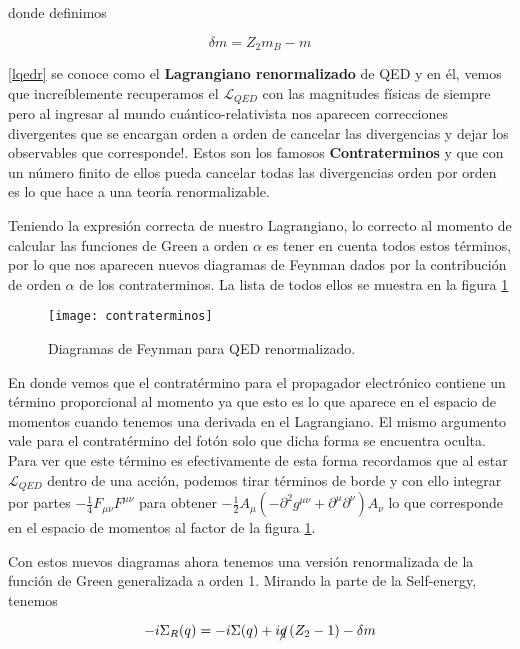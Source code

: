 \documentclass[tickz]{article}
\numberwithin{equation}{section}
\begin{document}
donde definimos 

\begin{equation}\label{deltam}
\delta m = Z_2 m_B - m
\end{equation}

\ref{lqedr} se conoce como el \textbf{Lagrangiano renormalizado} de QED y en él, vemos que increíblemente recuperamos el $ \mathscr{L}_{QED} $ con las magnitudes físicas de siempre pero al ingresar al mundo cuántico-relativista nos aparecen correcciones divergentes que se encargan orden a orden de cancelar las divergencias y dejar los observables que corresponde!. Estos son los famosos \textbf{Contraterminos} y que con un número finito de ellos pueda cancelar todas las divergencias orden por orden es lo que hace a una teoría renormalizable.

Teniendo la expresión correcta de nuestro Lagrangiano, lo correcto al momento de calcular las funciones de Green a orden $ \alpha $ es tener en cuenta todos estos términos, por lo que nos aparecen nuevos diagramas de Feynman dados por la contribución de orden $ \alpha $ de los contraterminos. La lista de todos ellos se muestra en la figura \ref{fig_contraterminos} 

\begin{figure}[h]
	\centering
	\texttt{[image: contraterminos]}
	\caption{Diagramas de Feynman para QED renormalizado.}
	\label{fig_contraterminos}
\end{figure}


En donde vemos que el contratérmino para el propagador electrónico contiene un término proporcional al momento ya que esto es lo que aparece en el espacio de momentos cuando tenemos una derivada en el Lagrangiano. El mismo argumento vale para el contratérmino del fotón solo que dicha forma se encuentra oculta. Para ver que este término es efectivamente de esta forma recordamos que al estar $ \mathscr{L}_{QED} $ dentro de una acción, podemos tirar términos de borde y con ello integrar por partes $ -\frac{1}{4}F_{ \mu\nu}F^{\mu\nu} $  para obtener $ -\frac{1}{2}A_{\mu}\left( -\partial^2 g^{\mu\nu} + \partial^{\mu} \partial^{\nu} \right)A_{\nu}  $ lo que corresponde en el espacio de momentos al factor de la figura \ref{fig_contraterminos}.

Con estos nuevos diagramas ahora tenemos una versión renormalizada de la función de Green generalizada a orden 1. Mirando la parte de la Self-energy, tenemos

\begin{equation}\label{aux8}
-i \Sigma_R(q) = -i \Sigma(q) + i\cancel{q}\left(Z_2 -1\right) -\delta m
\end{equation}
\end{document}
